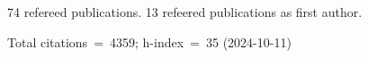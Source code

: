 74 refereed publications. 13 refeered publications as first author.

Total citations~=~4359; h-index~=~35 (2024-10-11)
